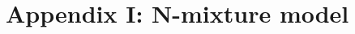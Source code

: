 \documentclass[11pt]{article}
\begin{document}

\renewcommand{\thefigure}{A\arabic{figure}}
\renewcommand{\theequation}{A\arabic{equation}}
\renewcommand{\thetable}{A\arabic{table}}
\setcounter{equation}{0}
\setcounter{figure}{0}
\setcounter{table}{0}

\section*{Appendix I: N-mixture model} 
\end{document}
